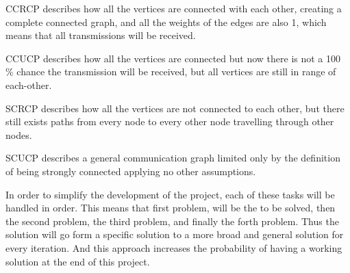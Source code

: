 CCRCP describes how all the vertices are connected with each other, creating a complete connected graph, and all the weights of the edges are also 1, which means that all transmissions will be received.

CCUCP describes how all the vertices are connected but now there is not a 100 \% chance the transmission will be received, but all vertices are still in range of each-other.

SCRCP describes how all the vertices are not connected to each other, but there still exists paths from every node to every other node travelling through other nodes.

SCUCP describes a general communication graph limited only by the definition of being strongly connected applying no other assumptions.

\bigskip \noindent
In order to simplify the development of the project, each of these tasks will be handled in order.
This means that first problem, will be the to be solved, then the second problem, the third problem, and finally the forth problem.
Thus the solution will go form a specific solution to a more broad and general solution for every iteration.
And this approach increases the probability of having a working solution at the end of this project.

